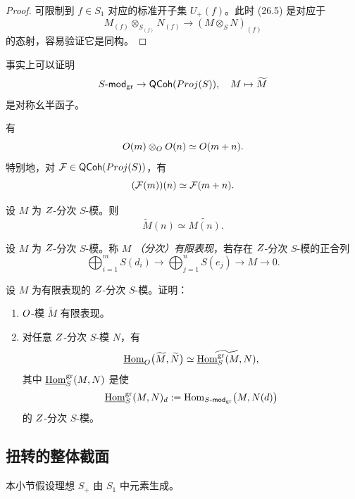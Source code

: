 \begin{proof}
可限制到 $f \in S_1$ 对应的标准开子集 $U_+(f)$。此时 (26.5) 是对应于
\[
M_{(f)} \otimes_{S_{(f)}} N_{(f)} \to (M \otimes_S N)_{(f)}
\]
的态射，容易验证它是同构。
\end{proof}

\begin{remark}\label{rem:26.2.7}
事实上可以证明
\[
S\text{-}\mathsf{mod}_{\mathrm{gr}} \to \mathsf{QCoh}(Proj(S)), \quad M \mapsto \widetilde{M}
\]
是对称幺半函子。
\end{remark}

\begin{corollary}\label{cor:26.2.8}
有
\[
O(m) \otimes_O O(n) \simeq O(m+n).
\]
特别地，对 $\mathcal{F} \in \mathsf{QCoh}(Proj(S))$，有
\[
(\mathcal{F}(m))(n) \simeq \mathcal{F}(m+n).
\]
\end{corollary}

\begin{corollary}\label{cor:26.2.9}
设 $M$ 为 $Z$-分次 $S$-模。则
\[
\widetilde{M}(n) \simeq \widetilde{M(n)}.
\]
\end{corollary}

\begin{definition}\label{def:26.2.10}
设 $M$ 为 $Z$-分次 $S$-模。称 $M$ \emph{（分次）有限表现}，若存在 $Z$-分次 $S$-模的正合列
\[
\bigoplus_{i=1}^{m} S(d_i) \to \bigoplus_{j=1}^{n} S(e_j) \to M \to 0.
\]
\end{definition}

\begin{exercise}\label{exc:26.2.11}
设 $M$ 为有限表现的 $Z$-分次 $S$-模。证明：
\begin{enumerate}[label=(\arabic*),leftmargin=2.4em,itemsep=0.25ex]
  \item $O$-模 $\widetilde{M}$ 有限表现。
  \item 对任意 $Z$-分次 $S$-模 $N$，有
  \[
  \underline{\mathrm{Hom}}_{O}\bigl(\widetilde{M}, \widetilde{N}\bigr) \simeq \widetilde{\underline{\mathrm{Hom}}^{\mathrm{gr}}_{S}(M, N)},
  \]
  其中 $\underline{\mathrm{Hom}}^{\mathrm{gr}}_{S}(M, N)$ 是使
  \[
  \underline{\mathrm{Hom}}^{\mathrm{gr}}_{S}(M, N)_d := \operatorname{Hom}_{S\text{-}\mathsf{mod}_{\mathrm{gr}}}\bigl(M, N(d)\bigr)
  \]
  的 $Z$-分次 $S$-模。
\end{enumerate}
\end{exercise}

\subsection{扭转的整体截面}\label{sec:26.3}

本小节假设理想 $S_+$ 由 $S_1$ 中元素生成。

